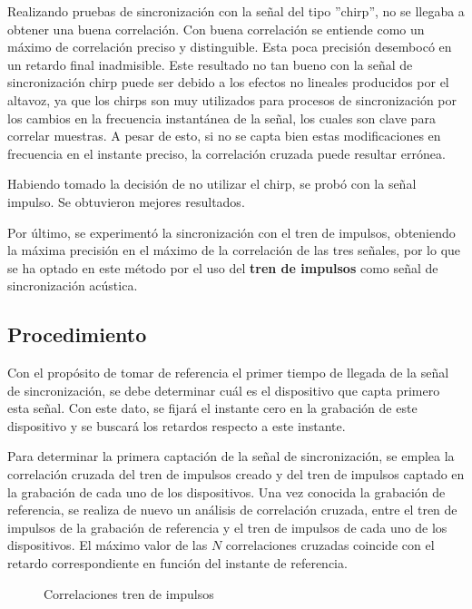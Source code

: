 \documentclass[a4paper,11pt]{book}
\begin{document}
Realizando pruebas de sincronización con la señal del tipo ''chirp'', no se llegaba a obtener una buena correlación. Con buena correlación se entiende como un máximo de correlación preciso y distinguible. Esta poca precisión desembocó en un retardo final inadmisible. Este resultado no tan bueno con la señal de sincronización chirp puede ser debido a los efectos no lineales producidos por el altavoz, ya que los chirps son muy utilizados para procesos de sincronización por los cambios en la frecuencia instantánea de la señal, los cuales son clave para correlar muestras. A pesar de esto, si no se capta bien estas modificaciones en frecuencia en el instante preciso, la correlación cruzada puede resultar errónea.

Habiendo tomado la decisión de no utilizar el chirp, se probó con la señal impulso. Se obtuvieron mejores resultados.

Por último, se experimentó la sincronización con el tren de impulsos, obteniendo la máxima precisión en el máximo de la correlación de las tres señales, por lo que se ha optado en este método por el uso del \textbf{tren de impulsos} como señal de sincronización acústica.

\subsection{Procedimiento}

Con el propósito de tomar de referencia el primer tiempo de llegada de la señal de sincronización, se debe determinar cuál es el dispositivo que capta primero esta señal. Con este dato, se fijará el instante cero en la grabación de este dispositivo y se buscará los retardos respecto a este instante.

Para determinar la primera captación de la señal de sincronización, se emplea la correlación cruzada del tren de impulsos creado y del tren de impulsos captado en la grabación de cada uno de los dispositivos. Una vez conocida la grabación de referencia, se realiza de nuevo un análisis de correlación cruzada, entre el tren de impulsos de la grabación de referencia y el tren de impulsos de cada uno de los dispositivos. El máximo valor de las $N$ correlaciones cruzadas coincide con el retardo correspondiente en función del instante de referencia.


\begin{figure}
 \centering
 \caption{Correlaciones tren de impulsos}
\end{figure}
\end{document}
